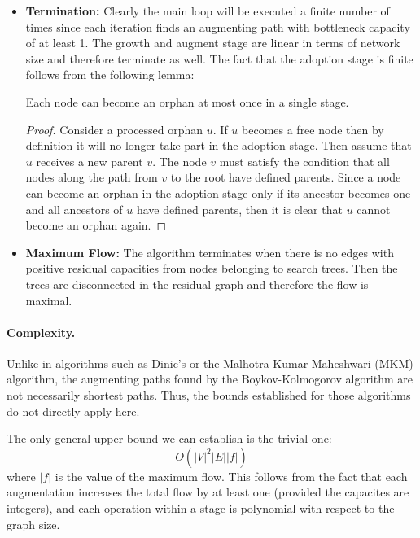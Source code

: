 \begin{itemize}
    \item \textbf{Termination:}  
    Clearly the main loop will be executed a finite number of times since each iteration finds an augmenting path with bottleneck capacity of at least 1.
The growth and augment stage are linear in terms of network size and therefore terminate as well.
The fact that the adoption stage is finite follows from the following lemma:
\begin{lemma}
Each node can become an orphan at most once in a single stage.
\end{lemma}
\begin{proof}
Consider a processed orphan $u$. If $u$ becomes a free node then by definition it will no longer take part in the adoption stage. Then assume that $u$ receives a new parent $v$. The node $v$ must satisfy the condition that all nodes along the path from $v$ to the root have defined parents. Since a node can become an orphan in the adoption stage only if its ancestor becomes one and all ancestors of $u$ have defined parents, then it is clear that $u$ cannot become an orphan again.
\end{proof}

    \item \textbf{Maximum Flow:}
    The algorithm terminates when there is no edges with positive residual capacities from nodes belonging to search trees. Then the trees are disconnected in the residual graph and therefore the flow is maximal.
    
\end{itemize}

\paragraph*{Complexity.}  
Unlike in algorithms such as Dinic’s or the Malhotra-Kumar-Maheshwari (MKM) algorithm, the augmenting paths found by the Boykov-Kolmogorov algorithm are not necessarily shortest paths. Thus, the bounds established for those algorithms do not directly apply here.

The only general upper bound we can establish is the trivial one:
$$O(|V|^2|E||f|)$$
where $|f|$ is the value of the maximum flow. This follows from the fact that each augmentation increases the total flow by at least one (provided the capacites are integers), and each operation within a stage is polynomial with respect to the graph size.

